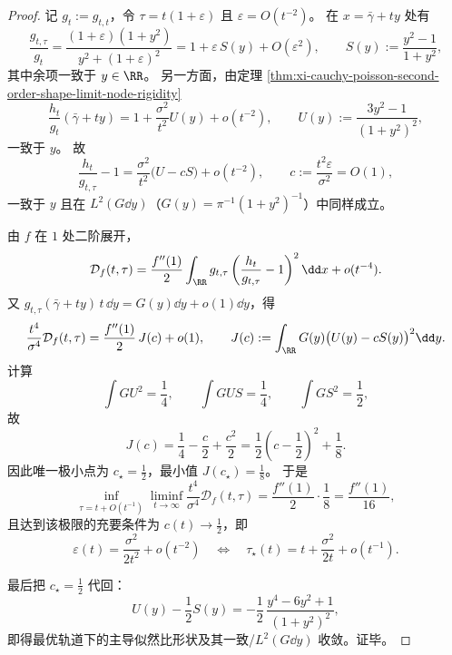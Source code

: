 \begin{proof}
记 \(g_t:=g_{t,t}\)，令 \(\tau=t(1+\varepsilon)\) 且 \(\varepsilon=O(t^{-2})\)。
在 \(x=\bar\gamma+ty\) 处有
\[
\frac{g_{t,\tau}}{g_t}
=\frac{(1+\varepsilon)(1+y^2)}{y^2+(1+\varepsilon)^2}
=1+\varepsilon\,S(y)+O(\varepsilon^2),
\qquad
S(y):=\frac{y^2-1}{1+y^2},
\]
其中余项一致于 \(y\in\RR\)。
另一方面，由定理 \ref{thm:xi-cauchy-poisson-second-order-shape-limit-node-rigidity}
\[
\frac{h_t}{g_t}(\bar\gamma+ty)
=1+\frac{\sigma^2}{t^2}U(y)+o(t^{-2}),
\qquad
U(y):=\frac{3y^2-1}{(1+y^2)^2},
\]
一致于 \(y\)。
故
\[
\frac{h_t}{g_{t,\tau}}-1
=\frac{\sigma^2}{t^2}\bigl(U-cS\bigr)+o(t^{-2}),
\qquad
c:=\frac{t^2\varepsilon}{\sigma^2}=O(1),
\]
一致于 \(y\) 且在 \(L^2(G\dd y)\)（\(G(y)=\pi^{-1}(1+y^2)^{-1}\)）中同样成立。

由 \(f\) 在 \(1\) 处二阶展开，
\[
\mathcal D_f(t,\tau)
=\frac{f''(1)}{2}\int_{\RR} g_{t,\tau}
\left(\frac{h_t}{g_{t,\tau}}-1\right)^2\dd x
+o(t^{-4}).
\]
又 \(g_{t,\tau}(\bar\gamma+ty)\,t\,\dd y=G(y)\dd y+o(1)\dd y\)，得
\[
\frac{t^4}{\sigma^4}\mathcal D_f(t,\tau)
=\frac{f''(1)}{2}\,J(c)+o(1),
\qquad
J(c):=\int_{\RR}G(y)\bigl(U(y)-cS(y)\bigr)^2\dd y.
\]
计算
\[
\int GU^2=\frac14,\qquad
\int GUS=\frac14,\qquad
\int GS^2=\frac12,
\]
故
\[
J(c)=\frac14-\frac{c}{2}+\frac{c^2}{2}
=\frac12\left(c-\frac12\right)^2+\frac18.
\]
因此唯一极小点为 \(c_\star=\frac12\)，最小值 \(J(c_\star)=\frac18\)。
于是
\[
\inf_{\tau=t+O(t^{-1})}\liminf_{t\to\infty}\frac{t^4}{\sigma^4}\mathcal D_f(t,\tau)
=\frac{f''(1)}{2}\cdot\frac18
=\frac{f''(1)}{16},
\]
且达到该极限的充要条件为
\(
c(t)\to\frac12
\)，即
\[
\varepsilon(t)=\frac{\sigma^2}{2t^2}+o(t^{-2})
\quad\Longleftrightarrow\quad
\tau_\star(t)=t+\frac{\sigma^2}{2t}+o(t^{-1}).
\]

最后把 \(c_\star=\frac12\) 代回：
\[
U(y)-\frac12S(y)
=-\frac12\,\frac{y^4-6y^2+1}{(1+y^2)^2},
\]
即得最优轨道下的主导似然比形状及其一致/\(L^2(G\dd y)\) 收敛。证毕。
\end{proof}

\endinput
